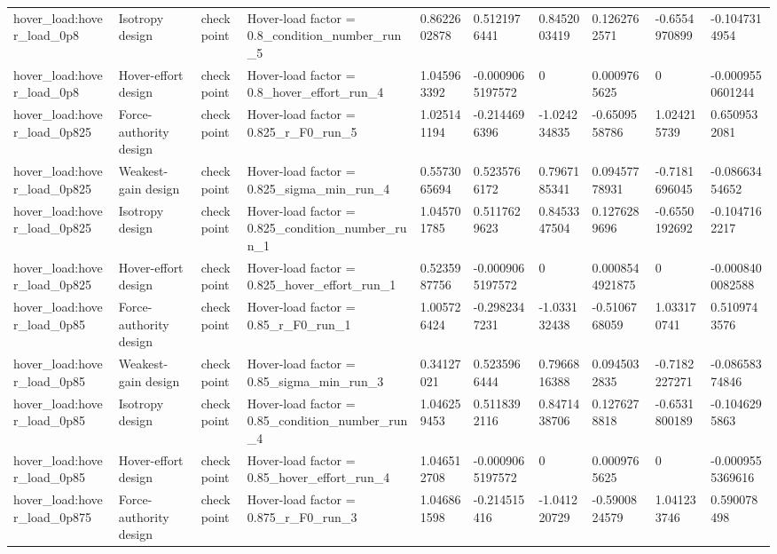 \begin{tabular}{@{}llllllllll@{}}
hover\_load:hover\_load\_0p8 & Isotropy design & checkpoint & Hover-load factor = 0.8\_condition\_number\_run\_5 & 0.8622602878 & 0.5121976441 & 0.8452003419 & 0.1262762571 & -0.6554970899 & -0.1047314954 \\
hover\_load:hover\_load\_0p8 & Hover-effort design & checkpoint & Hover-load factor = 0.8\_hover\_effort\_run\_4 & 1.045963392 & -0.0009065197572 & 0 & 0.0009765625 & 0 & -0.0009550601244 \\
hover\_load:hover\_load\_0p825 & Force-authority design & checkpoint & Hover-load factor = 0.825\_r\_F0\_run\_5 & 1.025141194 & -0.2144696396 & -1.024234835 & -0.6509558786 & 1.024215739 & 0.6509532081 \\
hover\_load:hover\_load\_0p825 & Weakest-gain design & checkpoint & Hover-load factor = 0.825\_sigma\_min\_run\_4 & 0.5573065694 & 0.5235766172 & 0.7967185341 & 0.09457778931 & -0.7181696045 & -0.08663454652 \\
hover\_load:hover\_load\_0p825 & Isotropy design & checkpoint & Hover-load factor = 0.825\_condition\_number\_run\_1 & 1.045701785 & 0.5117629623 & 0.8453347504 & 0.1276289696 & -0.6550192692 & -0.1047162217 \\
hover\_load:hover\_load\_0p825 & Hover-effort design & checkpoint & Hover-load factor = 0.825\_hover\_effort\_run\_1 & 0.5235987756 & -0.0009065197572 & 0 & 0.0008544921875 & 0 & -0.0008400082588 \\
hover\_load:hover\_load\_0p85 & Force-authority design & checkpoint & Hover-load factor = 0.85\_r\_F0\_run\_1 & 1.005726424 & -0.2982347231 & -1.033132438 & -0.5106768059 & 1.033170741 & 0.5109743576 \\
hover\_load:hover\_load\_0p85 & Weakest-gain design & checkpoint & Hover-load factor = 0.85\_sigma\_min\_run\_3 & 0.34127021 & 0.5235966444 & 0.7966816388 & 0.0945032835 & -0.7182227271 & -0.08658374846 \\
hover\_load:hover\_load\_0p85 & Isotropy design & checkpoint & Hover-load factor = 0.85\_condition\_number\_run\_4 & 1.046259453 & 0.5118392116 & 0.8471438706 & 0.1276278818 & -0.6531800189 & -0.1046295863 \\
hover\_load:hover\_load\_0p85 & Hover-effort design & checkpoint & Hover-load factor = 0.85\_hover\_effort\_run\_4 & 1.046512708 & -0.0009065197572 & 0 & 0.0009765625 & 0 & -0.0009555369616 \\
hover\_load:hover\_load\_0p875 & Force-authority design & checkpoint & Hover-load factor = 0.875\_r\_F0\_run\_3 & 1.046861598 & -0.214515416 & -1.041220729 & -0.5900824579 & 1.041233746 & 0.590078498 \\

\end{tabular}
